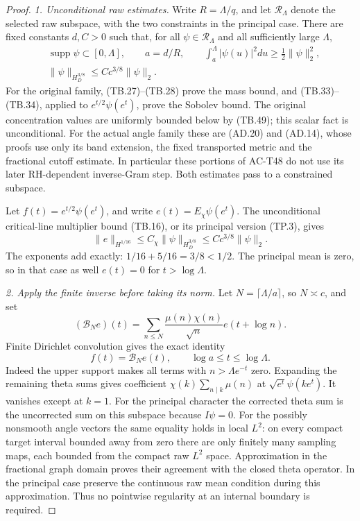 \begin{proof}
\emph{1. Unconditional raw estimates.}
Write \(R=\Lambda/q\), and let \(\mathcal R_\Lambda\)
denote the selected raw subspace, with the two constraints
in the principal case.
There are fixed constants \(d,C>0\) such that, for all
\(\psi\in\mathcal R_\Lambda\) and all sufficiently large
\(\Lambda\),
\[
 \begin{split}
 &\operatorname{supp}\psi\subset[0,\Lambda],\qquad
 a=d/R,\qquad
 \int_a^\Lambda|\psi(u)|^2du\geq\tfrac12\|\psi\|_2^2,\\
 &\|\psi\|_{H_D^{3/8}}\leq Cc^{3/8}\|\psi\|_2 .
 \end{split}
 \tag{UC.8}
\]
For the original family, (TB.27)--(TB.28) prove the mass
bound, and (TB.33)--(TB.34), applied to
\(e^{t/2}\psi(e^t)\), prove the Sobolev bound.
The original concentration values are uniformly bounded
below by (TB.49); this scalar fact is unconditional.
For the actual angle family these are (AD.20) and (AD.14),
whose proofs use only its band extension, the fixed
transported metric and the fractional cutoff estimate.
In particular these portions of AC-T48 do not use its
later RH-dependent inverse-Gram step.
Both estimates pass to a constrained subspace.

Let \(f(t)=e^{t/2}\psi(e^t)\), and write
\(e(t)=E_\chi\psi(e^t)\).
The unconditional critical-line multiplier bound (TB.16),
or its principal version (TP.3), gives
\[
              \|e\|_{H^{1/16}}
                   \leq C_\chi\|\psi\|_{H_D^{3/8}}
                   \leq Cc^{3/8}\|\psi\|_2 .
 \tag{UC.9}
\]
The exponents add exactly:
\(1/16+5/16=3/8<1/2\).
The principal mean is zero, so in that case as well
\(e(t)=0\) for \(t>\log\Lambda\).

\emph{2. Apply the finite inverse before taking its norm.}
Let \(N=\lceil\Lambda/a\rceil\), so \(N\asymp c\), and set
\[
 (\mathcal B_Ne)(t)
       =\sum_{n\leq N}\frac{\mu(n)\chi(n)}{\sqrt n}
                                      e(t+\log n).
 \tag{UC.10}
\]
Finite Dirichlet convolution gives the exact identity
\[
              f(t)=\mathcal B_Ne(t),
            \qquad \log a\leq t\leq\log\Lambda .
 \tag{UC.11}
\]
Indeed the upper support makes all terms with
\(n>\Lambda e^{-t}\) zero.  Expanding the remaining theta
sums gives coefficient
\(\chi(k)\sum_{n\mid k}\mu(n)\) at \(\sqrt{e^t}\psi(ke^t)\).
It vanishes except at \(k=1\).
For the principal character the corrected theta sum is the
uncorrected sum on this subspace because \(I\psi=0\).
For the possibly nonsmooth angle vectors the same equality
holds in local \(L^2\): on every compact target interval
bounded away from zero there are only finitely many sampling
maps, each bounded from the compact raw \(L^2\) space.
Approximation in the fractional graph domain proves their
agreement with the closed theta operator.
In the principal case preserve the continuous raw mean
condition during this approximation.
Thus no pointwise regularity at an internal boundary is required.


\end{proof}
